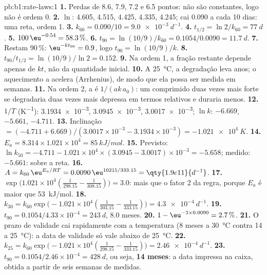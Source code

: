 \begin{solution}{pb:b1:rate-laws:1}
\textbf{1.} Perdas de 8.6, 7.9, 7.2 e 6.5 pontos: não são constantes,
logo não é ordem 0.
\textbf{2.} $\ln$: 4.605, 4.515, 4.425, 4.335, 4.245; cai 0.090 a cada
10 dias: uma reta, ordem 1.
\textbf{3.} $k_{60} = 0.090/10 = \qty{9.0e-3}{d^{-1}}$.
\textbf{4.} $t_{1/2} = \ln2/k_{60} = \qty{77}{d}$.
\textbf{5.} $100\,\eu^{-0.54} = 58.3\,\%$.
\textbf{6.} $t_{90} = \ln(10/9)/k_{60} = 0.1054/0.0090 = \qty{11.7}{d}$.
\textbf{7.} Restam 90\,\%: $\eu^{-kt_{90}} = 0.9$, logo $t_{90} = \ln(10/9)/k$.
\textbf{8.} $t_{90}/t_{1/2} = \ln(10/9)/\ln2 = 0.152$.
\textbf{9.} Na ordem 1, a fração restante depende apenas de $kt$, não da
quantidade inicial.
\textbf{10.} A \qty{25}{\celsius}, a degradação leva anos; o aquecimento
a acelera (Arrhenius), de modo que ela possa ser medida em semanas.
\textbf{11.} Na ordem 2, a  é $1/(ak\,a_0)$: um comprimido duas
vezes mais forte se degradaria duas vezes mais depressa em termos
relativos e duraria menos.
\textbf{12.} $1/T$ (\unit{K^{-1}}): \num{3.1934e-3}, \num{3.0945e-3},
\num{3.0017e-3}; $\ln k$: $-6.669$, $-5.661$, $-4.711$.
\textbf{13.} Inclinação $= (-4.711 + 6.669)/(3.0017 \times 10^{-3} - 3.1934 \times
10^{-3}) = \qty{-1.021e4}{K}$.
\textbf{14.} $E_a = 8.314 \times 1.021 \times 10^4 = \qty{85}{kJ/mol}$.
\textbf{15.} Previsto: $\ln k_{50} = -4.711 - 1.021 \times 10^4 \times (3.0945 -
3.0017) \times 10^{-3} = -5.658$; medido: $-5.661$: sobre a reta.
\textbf{16.} $A = k_{60}\,\eu^{E_a/RT} = 0.0090\,\eu^{10215/333.15} =
\qty{1.9e11}{d^{-1}}$.
\textbf{17.} $\exp\big(1.021 \times 10^4(\frac{1}{298.15} -
\frac{1}{308.15})\big) = 3.0$: mais que o fator 2 da regra, porque
$E_a$ é maior que \qty{53}{kJ/mol}.
\textbf{18.} $k_{30} = k_{60}\exp\big(-1.021 \times 10^4(\frac{1}{303.15} -
\frac{1}{333.15})\big) = \qty{4.3e-4}{d^{-1}}$.
\textbf{19.} $t_{90} = 0.1054/4.33 \times 10^{-4} = \qty{243}{d}$, 8.0
meses.
\textbf{20.} $1 - \eu^{-3 \times 0.0090} = 2.7\,\%$.
\textbf{21.} O prazo de validade cai rapidamente com a temperatura (8
meses a \qty{30}{\celsius} contra 14 a \qty{25}{\celsius}): a data de
validade só vale abaixo de \qty{25}{\celsius}.
\textbf{22.} $k_{25} = k_{60}\exp\big(-1.021 \times 10^4(\frac{1}{298.15} -
\frac{1}{333.15})\big) = \qty{2.46e-4}{d^{-1}}$.
\textbf{23.} $t_{90} = 0.1054/2.46 \times 10^{-4} = \qty{428}{d}$, ou
seja, \textbf{14 meses}: a data impressa na caixa, obtida a partir de
seis semanas de medidas.
\end{solution}
